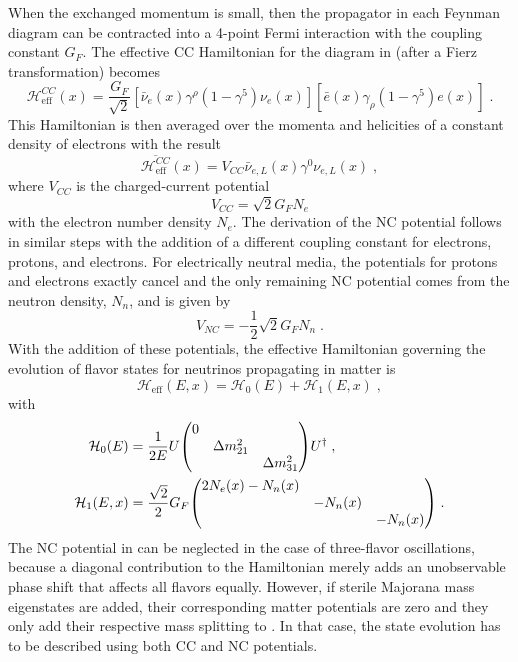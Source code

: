 When the exchanged momentum is small, then the propagator in each Feynman diagram can be contracted into a 4-point Fermi interaction with the coupling constant $G_F$. The effective CC Hamiltonian for the diagram in  (after a Fierz transformation) becomes
\begin{equation}
    \mathcal{H}_\mathrm{eff}^{CC}(x) = \frac{G_F}{\sqrt{2}}
    [\bar{\nu}_e(x)\gamma^\rho(1 - \gamma^5)\nu_e(x)]
    [\bar{e}(x)\gamma_\rho(1 - \gamma^5)e(x)]\;.\label{eq:h-eff-cc}
\end{equation}
This Hamiltonian is then averaged over the momenta and helicities of a constant density of electrons with the result
\begin{equation}
    \overline{\mathcal{H}_\mathrm{eff}^{CC}}(x) = V_{CC} \bar{\nu}_{e,L}(x)\gamma^0\nu_{e,L}(x)\;,
\end{equation}
where $V_{CC}$ is the charged-current potential
\begin{equation}
    V_{CC} = \sqrt{2}G_F N_e
\end{equation}
with the electron number density $N_e$. The derivation of the NC potential follows in similar steps with the addition of a different coupling constant for electrons, protons, and electrons. For electrically neutral media, the potentials for protons and electrons exactly cancel and the only remaining NC potential comes from the neutron density, $N_n$, and is given by
\begin{equation}
    V_{NC} = -\frac{1}{2}\sqrt{2}G_F N_n\;.
\end{equation}
With the addition of these potentials, the effective Hamiltonian governing the evolution of flavor states for neutrinos propagating in matter is
\begin{equation}
\mathcal{H}_\mathrm{eff}(E,x) = \mathcal{H}_0(E)  + \mathcal{H}_{1}(E,x)\;,
\end{equation}
with
\begin{subequations}
\label{eq:hamiltonian}
\begin{align}
\mathcal{H}_0 (E) &= \frac{1}{2E} U
\mqty(\dmat{0 , \Delta m^2_{21}, \Delta m^2_{31}})
U^\dag \label{eq:h0-flav-basis}\;,\\
\mathcal{H}_1 (E,x) &= \frac{\sqrt{2}}{2} G_F
\mqty(\dmat{2N_e(x) - N_n(x), -N_n(x), -N_n(x)})
\;.\label{eq:hi-flav-basis}
\end{align}
\end{subequations}
The NC potential in  can be neglected in the case of three-flavor oscillations, because a diagonal contribution to the Hamiltonian merely adds an unobservable phase shift that affects all flavors equally. However, if sterile Majorana  mass eigenstates are added, their corresponding matter potentials are zero and they only add their respective mass splitting to . In that case, the state evolution has to be described using both CC and NC potentials.

